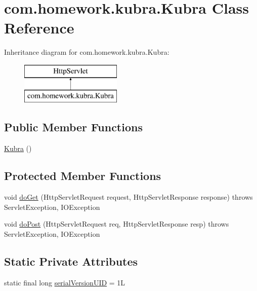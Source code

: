 \hypertarget{classcom_1_1homework_1_1kubra_1_1_kubra}{}\section{com.\+homework.\+kubra.\+Kubra Class Reference}
\label{classcom_1_1homework_1_1kubra_1_1_kubra}
Inheritance diagram for com.\+homework.\+kubra.\+Kubra\+:\begin{figure}[H]
\begin{center}
\leavevmode
\includegraphics[height=2.000000cm]{classcom_1_1homework_1_1kubra_1_1_kubra}
\end{center}
\end{figure}
\subsection*{Public Member Functions}
\begin{DoxyCompactItemize}
\item 
\hyperlink{classcom_1_1homework_1_1kubra_1_1_kubra_a426ba02e54e1b29f0faad26c3445c4f5}{Kubra} ()
\end{DoxyCompactItemize}
\subsection*{Protected Member Functions}
\begin{DoxyCompactItemize}
\item 
void \hyperlink{classcom_1_1homework_1_1kubra_1_1_kubra_ac848be3c477ee3497de96a7da7143537}{do\+Get} (Http\+Servlet\+Request request, Http\+Servlet\+Response response)  throws Servlet\+Exception, I\+O\+Exception 
\item 
void \hyperlink{classcom_1_1homework_1_1kubra_1_1_kubra_abd450e07b8b3abb94cd768c12727cf51}{do\+Post} (Http\+Servlet\+Request req, Http\+Servlet\+Response resp)  throws Servlet\+Exception, I\+O\+Exception 
\end{DoxyCompactItemize}
\subsection*{Static Private Attributes}
\begin{DoxyCompactItemize}
\item 
static final long \hyperlink{classcom_1_1homework_1_1kubra_1_1_kubra_a2eb40523c9e5223c53add8d16cc9ac0e}{serial\+Version\+U\+ID} = 1L
\end{DoxyCompactItemize}


